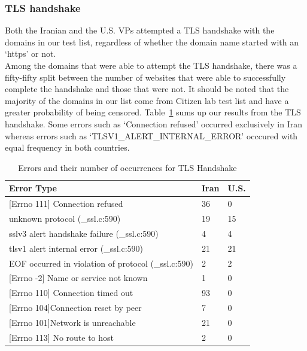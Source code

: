 \subsubsection{TLS handshake}
Both the Iranian and the U.S. VPs attempted a TLS handshake with the domains in our test list, regardless of whether the domain name started with an `https' or not. \\
Among the domains that were able to attempt the TLS handshake, there was a fifty-fifty split between the number of websites that were able to successfully complete the handshake and those that were not. It should be noted that the majority of the domains in our list come from Citizen lab test list and have a greater probability of being censored. Table~\ref{tab:error} sums up our results from the TLS handshake. Some errors such as `Connection refused' occurred exclusively in Iran whereas errors such as `TLSV1\_ALERT\_INTERNAL\_ERROR' occcured with equal frequency in both countries.\\
\begin{table}
  \caption{Errors and their number of occurrences for TLS Handshake}
  \label{tab:error}
  \begin{tabular}{ |p{5cm} |p{1cm} | p{1cm} |}
    \hline\hline
    Error Type&Iran&U.S.\\
    \hline
    {[Errno 111]} Connection refused&36&0\\
	unknown protocol (\_ssl.c:590)&19&15\\
	sslv3 alert handshake failure (\_ssl.c:590)&4&4\\
	 tlsv1 alert internal error (\_ssl.c:590)&21&21\\
	EOF occurred in violation of protocol (\_ssl.c:590)&2&2\\
	{[Errno -2]} Name or service not known&1&0\\
	{[Errno 110]} Connection timed out&93&0\\
	{[Errno 104]}Connection reset by peer&7&0\\
	{[Errno 101]}Network is unreachable&21&0\\
	{[Errno 113]} No route to host&2&0\\
 \hline
\end{tabular}
\end{table}


